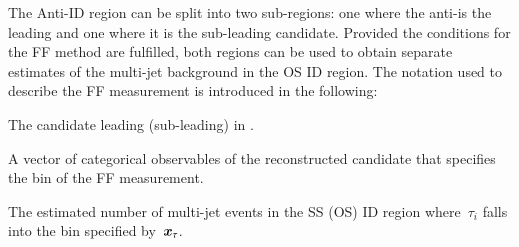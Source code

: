 {%
  \newcommand*{\ffargs}{\ensuremath{( \myvec{x}_{\tau} )}\xspace}

  \newcommand*{\NmjID}[2]{\ensuremath{N_\text{multi-jet}^{\text{#1, loose }\tau_{#2}}}\xspace}
  \newcommand*{\NmjIDIncl}[1]{\ensuremath{N_\text{multi-jet}^{\text{#1, ID}}}\xspace}

  \newcommand*{\NmjAntiIDIncl}[1]{\ensuremath{N_\text{multi-jet}^{\text{#1, Anti-ID}}}\xspace}
  \newcommand*{\NmjAntiID}[2]{\ensuremath{N_\text{multi-jet}^{\text{#1, anti-}\tau_{#2}}}\xspace}

  The Anti-ID region can be split into two sub-regions: one where the
  anti-\tauhadvis is the leading and one where it is the sub-leading \tauhadvis
  candidate. Provided the conditions for the FF method are fulfilled, both
  regions can be used to obtain separate estimates of the multi-jet background
  in the OS ID region. The notation used to describe the FF measurement is
  introduced in the following:
  \begin{description}[style=standard]
  \item[$\tau_0$ ($\tau_1$)] The \tauhadvis candidate leading (sub-leading) in \pT.

  \item[$\myvec{x}_\tau$] A vector of categorical observables of the
    reconstructed \tauhadvis candidate that specifies the bin of the FF
    measurement.

  \item[$\NmjID{SS(OS)}{i}\ffargs$] The estimated number of multi-jet events in
    the SS (OS) ID region where~$\tau_i$ falls into the bin specified
    by~$\myvec{x}_\tau$.


\end{description}}
